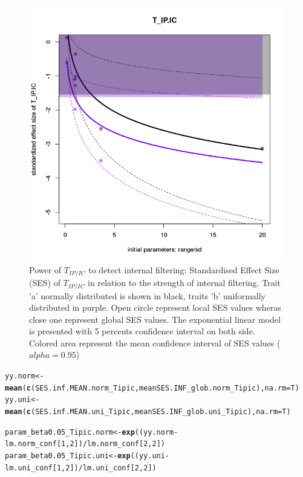 \documentclass[12pt]{article}\usepackage[]{graphicx}\usepackage[]{color}
\makeatletter
\def\maxwidth{ %
  \ifdim\Gin@nat@width>\linewidth
    \linewidth
  \else
    \Gin@nat@width
  \fi
}
\newcommand{\hlnum}[1]{\textcolor[rgb]{0.686,0.059,0.569}{#1}}%
\newcommand{\hlopt}[1]{\textcolor[rgb]{0,0,0}{#1}}%
\newcommand{\hlstd}[1]{\textcolor[rgb]{0.345,0.345,0.345}{#1}}%
\newcommand{\hlkwb}[1]{\textcolor[rgb]{0.69,0.353,0.396}{#1}}%
\newcommand{\hlkwc}[1]{\textcolor[rgb]{0.333,0.667,0.333}{#1}}%
\newcommand{\hlkwd}[1]{\textcolor[rgb]{0.737,0.353,0.396}{\textbf{#1}}}%
\newenvironment{kframe}{%
 \def\at@end@of@kframe{}%
 \ifinner\ifhmode%
  \def\at@end@of@kframe{\end{minipage}}%
  \begin{minipage}{\columnwidth}%
 \fi\fi%
 \def\FrameCommand##1{\hskip\@totalleftmargin \hskip-\fboxsep
 \colorbox{shadecolor}{##1}\hskip-\fboxsep
     \hskip-\linewidth \hskip-\@totalleftmargin \hskip\columnwidth}%
 \MakeFramed {\advance\hsize-\width
   \@totalleftmargin\z@ \linewidth\hsize
   \@setminipage}}%
 {\par\unskip\endMakeFramed%
 \at@end@of@kframe}
\newenvironment{knitrout}{}{} %
\makeatother
\begin{document}
\begin{knitrout}
\begin{figure}
{\centering \includegraphics[width=\maxwidth]{figure/In_conc_plot-1} 

}

\caption[Power of $T_{IP/IC}$ to detect internal filtering]{Power of $T_{IP/IC}$ to detect internal filtering: Standardised Effect Size (SES) of $T_{IP/IC}$ in relation to the strength of internal filtering. Trait 'a' normally distributed is shown in black, traits 'b' uniformally distributed in purple. Open circle represent local SES values wheras close one represent global SES values. The exponential linear model is presented with 5 percents confidence interval on both side. Colored area represent the mean confidence interval of SES values ($alpha = 0.95$)}\label{fig:In_conc_plot}
\end{figure}


\end{knitrout}

\begin{knitrout}\small
{}\color{fgcolor}\begin{kframe}
\begin{alltt}
\hlstd{yy.norm} \hlkwb{<-} \hlkwd{mean}\hlstd{(}\hlkwd{c}\hlstd{(SES.inf.MEAN.norm_Tipic, meanSES.INF_glob.norm_Tipic),} \hlkwc{na.rm} \hlstd{= T)}
\hlstd{yy.uni} \hlkwb{<-} \hlkwd{mean}\hlstd{(}\hlkwd{c}\hlstd{(SES.inf.MEAN.uni_Tipic, meanSES.INF_glob.uni_Tipic),} \hlkwc{na.rm} \hlstd{= T)}

\hlstd{param_beta0.05_Tipic.norm} \hlkwb{<-} \hlkwd{exp}\hlstd{((yy.norm} \hlopt{-} \hlstd{lm.norm_conf [}\hlnum{1}\hlstd{,} \hlnum{2}\hlstd{])} \hlopt{/} \hlstd{lm.norm_conf [}\hlnum{2}\hlstd{,} \hlnum{2}\hlstd{])}
\hlstd{param_beta0.05_Tipic.uni} \hlkwb{<-} \hlkwd{exp}\hlstd{((yy.uni} \hlopt{-} \hlstd{lm.uni_conf [}\hlnum{1}\hlstd{,} \hlnum{2}\hlstd{])} \hlopt{/} \hlstd{lm.uni_conf [}\hlnum{2}\hlstd{,} \hlnum{2}\hlstd{])}
\end{alltt}
\end{kframe}
\end{knitrout}
\end{document}
